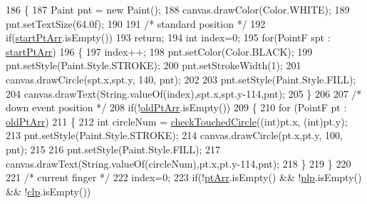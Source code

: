 \begin{DoxyCode}
186         \{
187             Paint pnt = \textcolor{keyword}{new} Paint();
188             canvas.drawColor(Color.WHITE);
189             pnt.setTextSize(64.0f);         
190             
191             \textcolor{comment}{/* standard position */}
192             \textcolor{keywordflow}{if}(\hyperlink{classcom_1_1example_1_1multitouchsample_1_1_main_activity_1_1_my_view_a8e580a64440ed09158aa2bbc50ad4cf6}{startPtArr}.isEmpty())
193                 \textcolor{keywordflow}{return};
194             \textcolor{keywordtype}{int} index=0;
195             \textcolor{keywordflow}{for}(PointF spt : \hyperlink{classcom_1_1example_1_1multitouchsample_1_1_main_activity_1_1_my_view_a8e580a64440ed09158aa2bbc50ad4cf6}{startPtArr})
196             \{
197                 index++;
198                 pnt.setColor(Color.BLACK);
199                 pnt.setStyle(Paint.Style.STROKE);
200                 pnt.setStrokeWidth(1);
201                 canvas.drawCircle(spt.x,spt.y, 140, pnt);
202 
203                 pnt.setStyle(Paint.Style.FILL);
204                 canvas.drawText(String.valueOf(index),spt.x,spt.y-114,pnt);
205             \}
206             
207             \textcolor{comment}{/* down event position */}
208             \textcolor{keywordflow}{if}(!\hyperlink{classcom_1_1example_1_1multitouchsample_1_1_main_activity_1_1_my_view_abf78b5272ae2cffeed639bd024d2a642}{oldPtArr}.isEmpty())
209             \{
210                 \textcolor{keywordflow}{for} (PointF pt : \hyperlink{classcom_1_1example_1_1multitouchsample_1_1_main_activity_1_1_my_view_abf78b5272ae2cffeed639bd024d2a642}{oldPtArr})
211                 \{
212                     \textcolor{keywordtype}{int} circleNum = \hyperlink{classcom_1_1example_1_1multitouchsample_1_1_main_activity_1_1_my_view_a98456bf5be1085790b22ea0179fa2892}{checkTouchedCircle}((\textcolor{keywordtype}{int})pt.x, (\textcolor{keywordtype}{int})pt.y);
213                     pnt.setStyle(Paint.Style.STROKE);
214                     canvas.drawCircle(pt.x,pt.y, 100, pnt);
215     
216                     pnt.setStyle(Paint.Style.FILL);
217                     canvas.drawText(String.valueOf(circleNum),pt.x,pt.y-114,pnt);
218                 \}
219             \}
220             
221             \textcolor{comment}{/* current finger */}
222             index=0;
223             \textcolor{keywordflow}{if}(!\hyperlink{classcom_1_1example_1_1multitouchsample_1_1_main_activity_1_1_my_view_ab2213518b7234955478ef54ebdd1db22}{ptArr}.isEmpty() && !\hyperlink{classcom_1_1example_1_1multitouchsample_1_1_main_activity_1_1_my_view_a594a2fb9e001c0cfa1aa538c903bc3f8}{plp}.isEmpty() && !\hyperlink{classcom_1_1example_1_1multitouchsample_1_1_main_activity_1_1_my_view_a3bbc2d3fe569814080fe27c6c64eca77}{clp}.isEmpty())

\end{DoxyCode}
